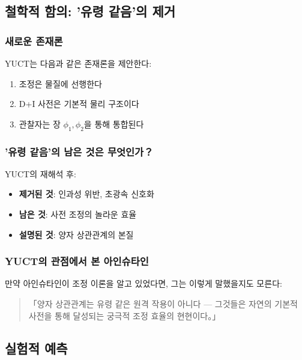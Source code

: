 \documentclass[11pt,a4paper]{article}
\begin{document}
\subsection{철학적 함의: '유령 같음'의 제거}
\label{subsec:philosophical}

\subsubsection{새로운 존재론}
YUCT는 다음과 같은 존재론을 제안한다:
\begin{enumerate}
\item 조정은 물질에 선행한다
\item D+I 사전은 기본적 물리 구조이다
\item 관찰자는 장 $\phi_1, \phi_2$을 통해 통합된다
\end{enumerate}

\subsubsection{'유령 같음'의 남은 것은 무엇인가？}
YUCT의 재해석 후:
\begin{itemize}
\item \textbf{제거된 것}: 인과성 위반, 초광속 신호화
\item \textbf{남은 것}: 사전 조정의 놀라운 효율
\item \textbf{설명된 것}: 양자 상관관계의 본질
\end{itemize}

\subsubsection{YUCT의 관점에서 본 아인슈타인}
만약 아인슈타인이 조정 이론을 알고 있었다면, 그는 이렇게 말했을지도 모른다:

\begin{quote}
「양자 상관관계는 유령 같은 원격 작용이 아니다 — 그것들은 자연의 기본적 사전을 통해 달성되는 궁극적 조정 효율의 현현이다。」
\end{quote}

\subsection{실험적 예측}
\label{subsec:epr-experimental}
\end{document}
